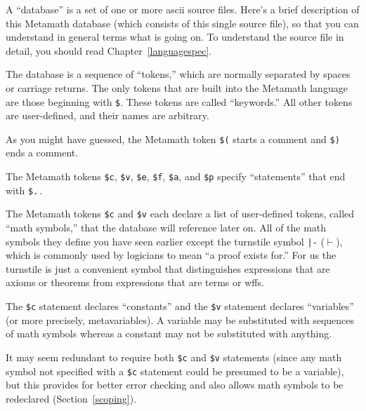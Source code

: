 A ``database'' is a set of one or more {\sc ascii} source
files.  Here's a brief description of this Metamath database
(which consists of this single source file), so that you can understand in
general terms what is going on.  To understand the source file in detail, you
should read Chapter~\ref{languagespec}.

The database is a sequence of ``tokens,'' which are normally
separated by spaces or carriage returns.  The only tokens that are built into
the Metamath language are those beginning with \texttt{\$}.  These tokens
are called ``keywords.''  All other tokens are
user-defined, and their names are arbitrary.

As you might have guessed, the Metamath token \texttt{\$(} starts a comment and \texttt{\$)} ends a comment.

The Metamath tokens \texttt{\$c},
\texttt{\$v},
\texttt{\$e},
\texttt{\$f},
\texttt{\$a}, and
\texttt{\$p} specify ``statements'' that
end with \texttt{\$.}\,.

The Metamath tokens \texttt{\$c} and \texttt{\$v} each declare a list of user-defined tokens, called
``math symbols,'' that the database will reference later
on.  All of the math symbols they define you have seen earlier except the
turnstile symbol \texttt{|-} ($\vdash$), which is
commonly used by logicians to mean ``a proof exists for.''  For us
the turnstile is just a
convenient symbol that distinguishes expressions that are axioms
or theorems from expressions that are terms or wffs.

The \texttt{\$c} statement declares ``constants'' and
the \texttt{\$v} statement declares
``variables'' (or more precisely, metavariables).  A
variable may be substituted with sequences of math symbols whereas a constant may not
be substituted with anything.

It may seem redundant to require both \texttt{\$c} and
\texttt{\$v} statements (since any math
symbol not specified with a \texttt{\$c} statement could be
presumed to be a variable), but this provides for better error checking and
also allows math symbols to be redeclared
(Section~\ref{scoping}).

